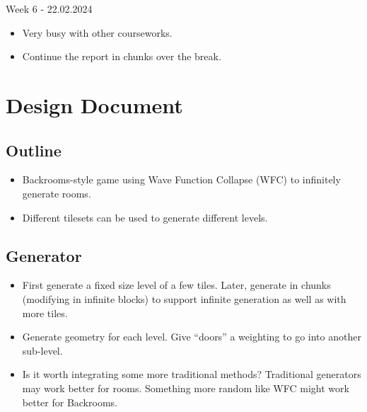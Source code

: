 \noindent Week 6 - 22.02.2024
\begin{itemize}
    \item Very busy with other courseworks.
    \item Continue the report in chunks over the break.
\end{itemize}


\chapter{Design Document}
\section*{Outline}
\begin{itemize}
    \item Backrooms-style game using Wave Function Collapse (WFC) to infinitely generate rooms.
    \item Different tilesets can be used to generate different levels.
\end{itemize}

\section*{Generator}
\begin{itemize}
    \item First generate a fixed size level of a few tiles. Later, generate in chunks (modifying in infinite blocks) to support infinite generation as well as with more tiles.
    \item Generate geometry for each level. Give “doors” a weighting to go into another sub-level.
    \item Is it worth integrating some more traditional methods? Traditional generators may work better for rooms. Something more random like WFC might work better for Backrooms.
\end{itemize}

